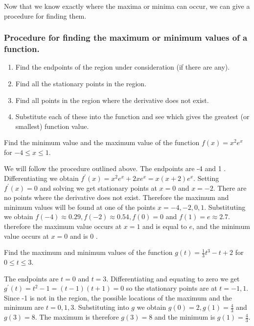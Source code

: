 Now that we know exactly where the maxima or minima can occur, we can give a procedure for finding them.

\subsubsection*{Procedure for finding the maximum or minimum values of a function.}
\begin{enumerate}
  \item Find the endpoints of the region under consideration (if there are any).
  \item Find all the stationary points in the region.
  \item Find all points in the region where the derivative does not exist.
  \item Substitute each of these into the function and see which gives the greatest (or smallest) function value.
\end{enumerate}

\begin{example}

    Find the minimum value and the maximum value of the function $f(x)=x^{2} e^{x}$ for $-4 \leq x \leq 1$.
\end{example}

\begin{solution} We will follow the procedure outlined above. The endpoints are -4 and 1 . Differentiating we obtain $f^{\prime}(x)=x^{2} e^{x}+2 x e^{x}=x(x+2) e^{x}$. Setting $f^{\prime}(x)=0$ and solving we get stationary points at $x=0$ and $x=-2$. There are no points where the derivative does not exist. Therefore the maximum and minimum values will be found at one of the points $x=-4,-2,0,1$. Substituting we obtain $f(-4) \approx 0.29, f(-2) \approx 0.54, f(0)=0$ and $f(1)=e \approx 2.7$. therefore the maximum value occurs at $x=1$ and is equal to $e$, and the minimum value occurs at $x=0$ and is 0 .
\end{solution}

\begin{example}

    Find the maximum and minimum values of the function $g(t)=\frac{1}{3} t^{3}-t+2$ for $0 \leq t \leq 3$.
\end{example}

\begin{solution} The endpoints are $t=0$ and $t=3$. Differentiating and equating to zero we get $g^{\prime}(t)=t^{2}-1=(t-1)(t+1)=0$ so the stationary points are at $t=-1,1$. Since -1 is not in the region, the possible locations of the maximum and the minimum are $t=0,1,3$. Substituting into $g$ we obtain $g(0)=2, g(1)=\frac{4}{3}$ and $g(3)=8$. The maximum is therefore $g(3)=8$ and the minimum is $g(1)=\frac{4}{3}$.
\end{solution}


